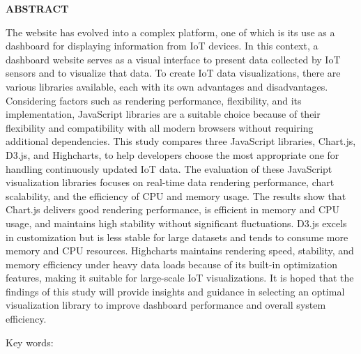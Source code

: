 \clearpage
{}
{}
\begin{center}
    \textbf{ABSTRACT}\\[0.5cm]
\end{center}

The website has evolved into a complex platform, one of which is its use as a dashboard for displaying information from IoT devices. In this context, a dashboard website serves as a visual interface to present data collected by IoT sensors and to visualize that data. To create IoT data visualizations, there are various libraries available, each with its own advantages and disadvantages. Considering factors such as rendering performance, flexibility, and its implementation, JavaScript libraries are a suitable choice because of their flexibility and compatibility with all modern browsers without requiring additional dependencies. This study compares three JavaScript libraries, Chart.js, D3.js, and Highcharts, to help developers choose the most appropriate one for handling continuously updated IoT data. The evaluation of these JavaScript visualization libraries focuses on real-time data rendering performance, chart scalability, and the efficiency of CPU and memory usage. The results show that Chart.js delivers good rendering performance, is efficient in memory and CPU usage, and maintains high stability without significant fluctuations. D3.js excels in customization but is less stable for large datasets and tends to consume more memory and CPU resources. Highcharts maintains rendering speed, stability, and memory efficiency under heavy data loads because of its built-in optimization features, making it suitable for large-scale IoT visualizations. It is hoped that the findings of this study will provide insights and guidance in selecting an optimal visualization library to improve dashboard performance and overall system efficiency.


\noindent Key words: \keywords